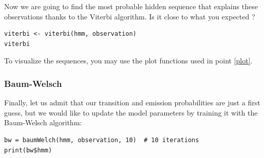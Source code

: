 \documentclass[a4paper,11pt]{article}
\begin{document}
Now we are going to find the most probable hidden sequence that explains these observations thanks to the Viterbi algorithm. Is it close to what you expected ? 

\begin{verbatim}
viterbi <- viterbi(hmm, observation)
viterbi
\end{verbatim}
To visualize the sequences, you may use the plot functions used in point \ref{plot}. 

\subsubsection{Baum-Welsch}

Finally, let us admit that our transition and emission probabilities are just a first guess, but we would like to update the model parameters by training it with the Baum-Welsch algorithm:

\begin{verbatim}
bw = baumWelch(hmm, observation, 10)  # 10 iterations
print(bw$hmm)
\end{verbatim}
\end{document}
